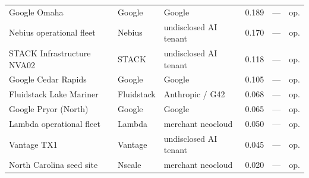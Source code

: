 \documentclass[11pt,a4paper]{article}
\begin{document}
\begin{small}
\begin{longtable}{@{}p{4.5cm} p{2.4cm} p{2.4cm} r r p{1.8cm}@{}}
Google Omaha & Google & Google & 0.189 & — & op. \\

Nebius operational fleet & Nebius & undisclosed AI tenant & 0.170 & — & op. \\

STACK Infrastructure NVA02 & STACK & undisclosed AI tenant & 0.118 & — & op. \\

Google Cedar Rapids & Google & Google & 0.105 & — & op. \\

Fluidstack Lake Mariner & Fluidstack & Anthropic / G42 & 0.068 & — & op. \\

Google Pryor (North) & Google & Google & 0.065 & — & op. \\

Lambda operational fleet & Lambda & merchant neocloud & 0.050 & — & op. \\

Vantage TX1 & Vantage & undisclosed AI tenant & 0.045 & — & op. \\

North Carolina seed site & Nscale & merchant neocloud & 0.020 & — & op. \\

\end{longtable}\end{small}
\end{document}
